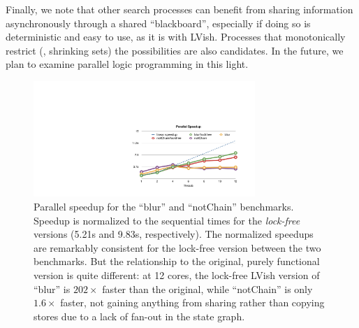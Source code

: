 Finally, we note that other search processes can benefit from sharing
information asynchronously through a shared ``blackboard'', especially if doing
so is deterministic and easy to use, as it is with LVish.  Processes that
monotonically restrict (\eg, shrinking sets) the possibilities are also
candidates.  In the future, we plan to examine parallel logic programming in
this light.
\fi




\begin{figure}  

\begin{center}
  \includegraphics[width=3.3in]{figures/CFA_speedups.pdf}
\end{center}
  \caption{Parallel speedup for the ``blur'' and ``notChain'' benchmarks.
    Speedup is normalized to the sequential times for the {\em lock-free}
    versions (5.21s and 9.83s, respectively).  
%
    The normalized speedups are remarkably consistent for the lock-free version
    between the two benchmarks.  But the relationship to the original, purely
    functional version is quite different: at 12 cores, the lock-free LVish
    version of ``blur'' is $202\times$ faster than the original, while ``notChain'' is only
    $1.6\times$ faster, 
    not gaining anything from sharing rather than copying stores
    due to a lack of fan-out in the state graph.
}
  \label{fig:bench}
\end{figure}



